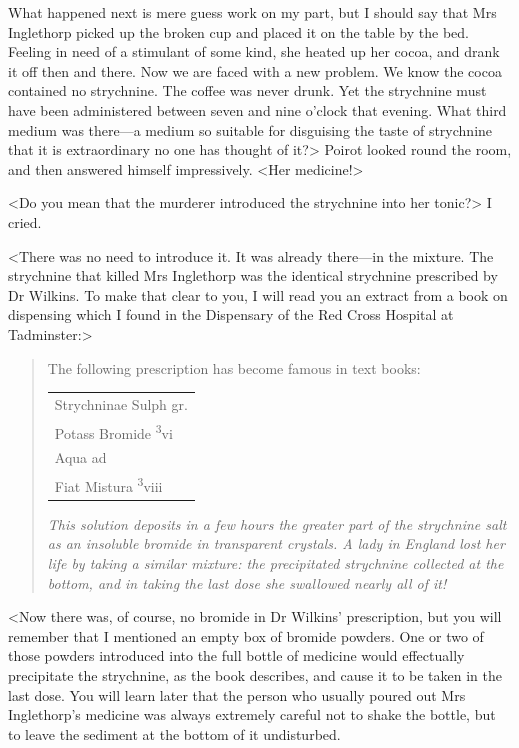  What happened next is mere guess work on my part, but I should say that Mrs Inglethorp picked up the broken cup and placed it on the table by the bed. Feeling in need of a stimulant of some kind, she heated up her cocoa, and drank it off then and there. Now we are faced with a new problem. We know the cocoa contained no strychnine. The coffee was never drunk. Yet the strychnine must have been administered between seven and nine o'clock that evening. What third medium was there—a medium so suitable for disguising the taste of strychnine that it is extraordinary no one has thought of it?> Poirot looked round the room, and then answered himself impressively. <Her medicine!> 

 <Do you mean that the murderer introduced the strychnine into her tonic?> I cried. 

 <There was no need to introduce it. It was already there—in the mixture. The strychnine that killed Mrs Inglethorp was the identical strychnine prescribed by Dr Wilkins. To make that clear to you, I will read you an extract from a book on dispensing which I found in the Dispensary of the Red Cross Hospital at Tadminster:>

\begin{quotation}
	The following prescription has become famous in text books: 
	
	\begin{tabular}{l}
Strychninae Sulph \dotfill 1 gr.\\
Potass Bromide \dotfill \textsuperscript{3}vi\\
Aqua ad\\Fiat Mistura \dotfill \textsuperscript{3}viii\\
\end{tabular}

\textit{This solution deposits in a few hours the greater part of the strychnine salt as an insoluble bromide in transparent crystals. A lady in England lost her life by taking a similar mixture: the precipitated strychnine collected at the bottom, and in taking the last dose she swallowed nearly all of it!} 
\end{quotation}

 <Now there was, of course, no bromide in Dr Wilkins' prescription, but you will remember that I mentioned an empty box of bromide powders. One or two of those powders introduced into the full bottle of medicine would effectually precipitate the strychnine, as the book describes, and cause it to be taken in the last dose. You will learn later that the person who usually poured out Mrs Inglethorp's medicine was always extremely careful not to shake the bottle, but to leave the sediment at the bottom of it undisturbed. 

